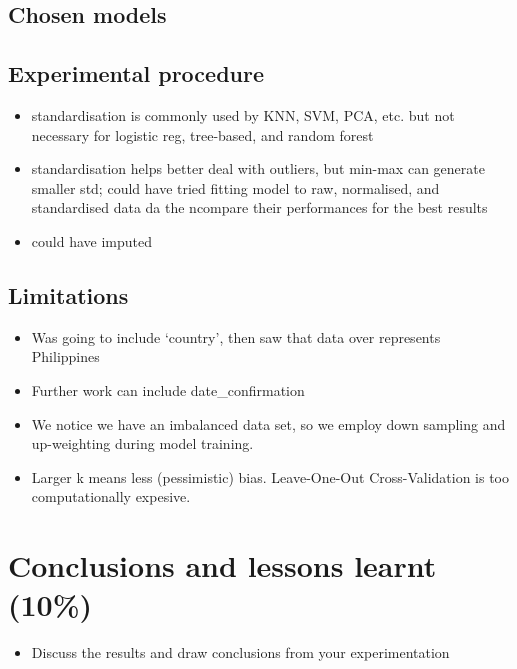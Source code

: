 \documentclass[twoside,11pt]{article}
\begin{document}
\subsection{Chosen models}
\subsection{Experimental procedure}
\begin{itemize}
    \item standardisation is commonly used by KNN, SVM, PCA, etc. but not necessary for logistic reg, tree-based, and random forest
    \item standardisation helps better deal with outliers, but min-max can generate smaller std; could have tried fitting model to raw, normalised, and standardised data da the ncompare their performances for the best results
    \item could have imputed
\end{itemize}
\subsection{Limitations}
\begin{itemize}
    \item Was going to include `country', then saw that data over represents Philippines
    \item Further work can include date\_confirmation
    \item We notice we have an imbalanced data set, so we employ down sampling and up-weighting during model training.
    \item Larger k means less (pessimistic) bias. Leave-One-Out Cross-Validation is too computationally expesive.
\end{itemize}

\section{Conclusions and lessons learnt (10\%)}
\begin{itemize}
    \item Discuss the results and draw conclusions from your experimentation
\end{itemize}




\vskip 0.2in

\end{document}
